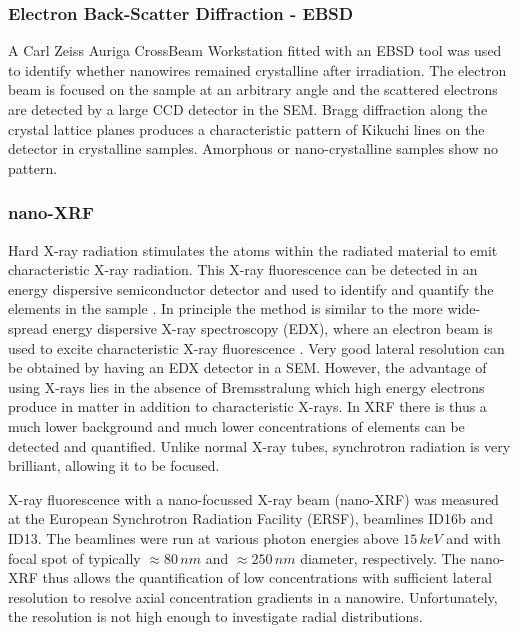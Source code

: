\subsubsection{Electron Back-Scatter Diffraction - EBSD}

A Carl Zeiss Auriga CrossBeam Workstation fitted with an EBSD tool was used to identify whether nanowires remained crystalline after irradiation. The electron beam is focused on the sample at an arbitrary angle and the scattered electrons are detected by a large CCD detector in the SEM. Bragg diffraction along the crystal lattice planes produces a characteristic pattern of Kikuchi lines on the detector \cite{kikuchi_diffraction_1928,fultz_transmission_2013} in crystalline samples. Amorphous or nano-crystalline samples show no pattern.

\subsubsection{nano-XRF}

Hard X-ray radiation stimulates the atoms within the radiated material to emit characteristic X-ray radiation. This X-ray fluorescence can be detected in an energy dispersive semiconductor detector and used to identify and quantify the elements in the sample \cite{glocker_quantitative_1928}. In principle the method is similar to the more wide-spread energy dispersive X-ray spectroscopy (EDX), where an electron beam is used to excite characteristic X-ray fluorescence \cite{jansen_elemental_1982}. Very good lateral resolution can be obtained by having an EDX detector in a SEM. However, the advantage of using X-rays lies in the absence of Bremsstralung which high energy electrons produce in matter in addition to characteristic X-rays. In XRF there is thus a much lower background and much lower concentrations of elements can be detected and quantified. Unlike normal X-ray tubes, synchrotron radiation is very brilliant, allowing it to be focused. 

X-ray fluorescence with a nano-focussed X-ray beam (nano-XRF) was measured at the European Synchrotron Radiation Facility (ERSF), beamlines ID16b and ID13. The beamlines were run at various photon energies above $15\,keV$ and with focal spot of typically $\approx 80\,nm$ and $\approx 250\,nm$ diameter, respectively. The nano-XRF thus allows the quantification of low concentrations with sufficient lateral resolution to resolve axial concentration gradients in a nanowire. Unfortunately, the resolution is not high enough to investigate radial distributions. 


